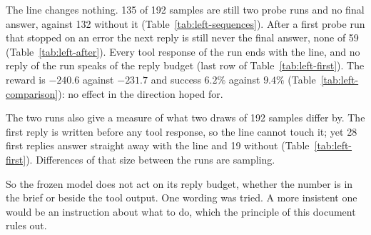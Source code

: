 \documentclass[11pt,a4paper]{article}
\begin{document}
The line changes nothing. 135 of 192 samples are still two probe runs and
no final answer, against 132 without it (Table~\ref{tab:left-sequences}).
After a first probe run that stopped on an error the next reply is still
never the final answer, none of 59 (Table~\ref{tab:left-after}). Every tool
response of the run ends with the line, and no reply of the run speaks of
the reply budget (last row of Table~\ref{tab:left-first}). The reward is
$-240.6$ against $-231.7$ and success $6.2\%$ against $9.4\%$
(Table~\ref{tab:left-comparison}): no effect in the direction hoped for.

The two runs also give a measure of what two draws of 192 samples differ
by. The first reply is written before any tool response, so the line cannot
touch it; yet 28 first replies answer straight away with the line and 19
without (Table~\ref{tab:left-first}). Differences of that size between the
runs are sampling.

So the frozen model does not act on its reply budget, whether the number is
in the brief or beside the tool output. One wording was tried. A more
insistent one would be an instruction about what to do, which the principle
of this document rules out.

\clearpage
\end{document}
